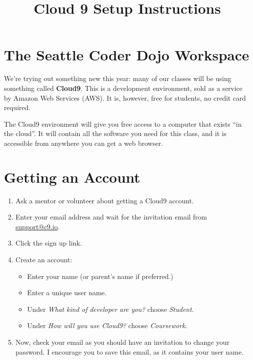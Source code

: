 \documentclass{article}
\title{Cloud 9 Setup Instructions}
\author{}
\date{}
\begin{document}
\maketitle
\thispagestyle{empty}

\section*{The Seattle Coder Dojo Workspace}
We're trying out something new this year: many of our classes will be using
something called \textbf{Cloud9}. This is a development environment, sold as a
service by Amazon Web Services (AWS). It is, however, free for students, no
credit card required.

The Cloud9 environment will give you free access to a computer that exists ``in
the cloud''. It will contain all the software you need for this class, and it
is accessible from anywhere you can get a web browser.

\section*{Getting an Account}
\begin{enumerate}
    \item Ask a mentor or volunteer about getting a Cloud9 account.
    \item Enter your email address and wait for the invitation email from \url{support@c9.io}.
    \item Click the sign up link.
    \item Create an account:
        \begin{itemize}
            \item Enter your name (or parent's name if preferred.)
            \item Enter a unique user name.
            \item Under \textit{What kind of developer are you?} choose \textit{Student}.
            \item Under \textit{How will you use Cloud9?} choose \textit{Coursework}.
        \end{itemize}

    \item Now, check your email as you should have an invitation to change your
        password. I encourage you to save this email, as it contains your
        user name.
\end{enumerate}
\end{document}
